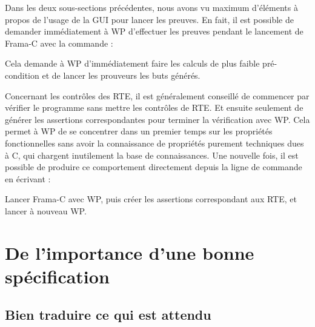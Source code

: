 \documentclass[12pt,francais,]{scrbook}
\newenvironment{Shaded}{}{}
\newcommand{\KeywordTok}[1]{\textcolor[rgb]{0.00,0.44,0.13}{\textbf{{#1}}}}
\newcommand{\NormalTok}[1]{{#1}}
\begin{document}
Dans les deux sous-sections précédentes, nous avons vu maximum
d'éléments à propos de l'usage de la GUI pour lancer les preuves. En
fait, il est possible de demander immédiatement à WP d'effectuer les
preuves pendant le lancement de Frama-C avec la commande :

\begin{footnotesize}\begin{Shaded}
\end{Shaded}\end{footnotesize}

Cela demande à WP d'immédiatement faire les calculs de plus faible
pré-condition et de lancer les prouveurs les buts générés.

Concernant les contrôles des RTE, il est généralement conseillé de
commencer par vérifier le programme sans mettre les contrôles de RTE. Et
ensuite seulement de générer les assertions correspondantes pour
terminer la vérification avec WP. Cela permet à WP de se \og{}concentrer\fg{}
dans un premier temps sur les propriétés fonctionnelles sans avoir la
connaissance de propriétés purement techniques dues à C, qui chargent
inutilement la base de connaissances. Une nouvelle fois, il est possible
de produire ce comportement directement depuis la ligne de commande en
écrivant :

\begin{footnotesize}\begin{Shaded}
\end{Shaded}\end{footnotesize}

\og{}Lancer Frama-C avec WP, puis créer les assertions correspondant aux
RTE, et lancer à nouveau WP\fg{}.

\section{De l'importance d'une bonne
spécification}\label{de-limportance-dune-bonne-spuxe9cification}

\subsection{Bien traduire ce qui est
attendu}\label{bien-traduire-ce-qui-est-attendu}
\end{document}

